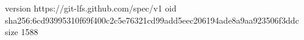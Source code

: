 version https://git-lfs.github.com/spec/v1
oid sha256:6cd93995310f69f400c2c5e76321cd99add5eec206194ade8a9aa923506f3ddc
size 1588
